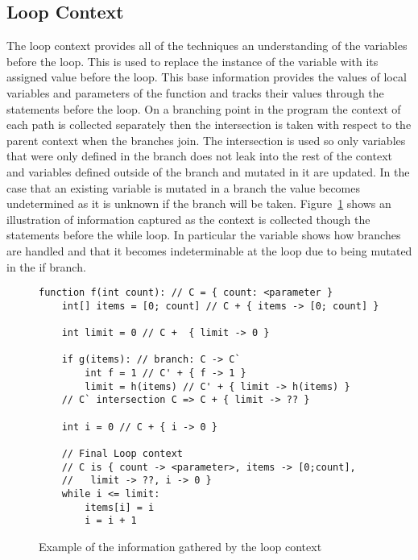\subsection{Loop Context}\label{s:loop-context}


The loop context provides all of the techniques an understanding of the
variables before the loop.
This is used to replace the instance of the variable with its assigned value
before the loop.
This base information provides the values of local variables and parameters of
the function and tracks their values through the statements before the loop.
On a branching point in the program the context of each path is collected
separately then the intersection is taken with respect to the
parent context when the branches join.
The intersection is used so only variables that were only defined in the
branch does not leak into the rest of the context and variables defined outside
of the branch and mutated in it are updated.
In the case that an existing variable is mutated in a branch the value becomes
undetermined as it is unknown if the branch will be taken.
Figure~\ref{lst:loop-context} shows an illustration of information captured as
the context is collected though the statements before the while loop.
In particular the variable  shows how branches are handled
and that it becomes indeterminable at the loop due to being mutated in the if
branch.

\begin{figure}[ht]
\begin{lstlisting}
function f(int count): // C = { count: <parameter }
    int[] items = [0; count] // C + { items -> [0; count] }

    int limit = 0 // C +  { limit -> 0 } 

    if g(items): // branch: C -> C`
        int f = 1 // C' + { f -> 1 }
        limit = h(items) // C' + { limit -> h(items) }
    // C` intersection C => C + { limit -> ?? }

    int i = 0 // C + { i -> 0 }

    // Final Loop context
    // C is { count -> <parameter>, items -> [0;count],
    //   limit -> ??, i -> 0 }
    while i <= limit:
        items[i] = i
        i = i + 1
\end{lstlisting}
\caption{Example of the information gathered by the loop context}
\label{lst:loop-context}
\end{figure}

